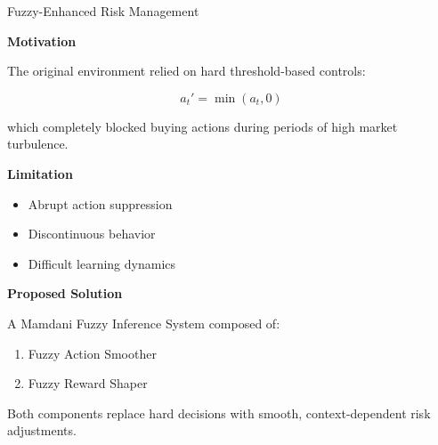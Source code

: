 \documentclass[10pt]{beamer}
\begin{document}
\begin{frame}{Fuzzy-Enhanced Risk Management}

\textbf{Motivation}

\vspace{0.2cm}

The original environment relied on hard threshold-based controls:

\[
a_t' = \min(a_t,0)
\]

which completely blocked buying actions during periods of high market
turbulence.

\vspace{0.3cm}

\textbf{Limitation}

\begin{itemize}
    \item Abrupt action suppression
    \item Discontinuous behavior
    \item Difficult learning dynamics
\end{itemize}

\vspace{0.3cm}

\textbf{Proposed Solution}

A Mamdani Fuzzy Inference System composed of:

\begin{enumerate}
    \item Fuzzy Action Smoother
    \item Fuzzy Reward Shaper
\end{enumerate}

Both components replace hard decisions with smooth, context-dependent
risk adjustments.

\end{frame}
\end{document}
